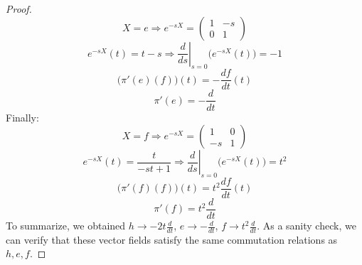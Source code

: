 \documentclass[12 pt]{article}
\begin{document}
\begin{proof}
\[    X = e \Rightarrow e^{-sX} =    \left( \begin{array} {cc} 1 & -s \\  0 & 1  \end{array} \right)   \]
\[      e^{-sX} (t) = t-s  \Rightarrow \left. \frac{d}{ds}\right|_{s=0} \big( e^{-sX} (t) \big) = -1  \]
\[     \big(  \pi'(e) (f) \big) (t) = - \frac{df}{dt} (t)    \]
\[      \pi'(e) = - \frac{d}{dt}    \]
Finally:
\[    X = f \Rightarrow e^{-sX} =    \left( \begin{array} {cc} 1 & 0 \\  -s & 1  \end{array} \right)   \]
\[      e^{-sX} (t) = \frac{t}{-st + 1} \Rightarrow \left. \frac{d}{ds}\right|_{s=0} \big( e^{-sX} (t) \big) = t^2  \]
\[     \big(  \pi'(f) (f) \big) (t) = t^2 \frac{df}{dt} (t)    \]
\[      \pi'(f) = t^2 \frac{d}{dt}    \]
To summarize, we obtained $h \to -2t \frac{d}{dt} $, $e \to  - \frac{d}{dt}$, $f \to  t^2 \frac{d}{dt}$. As a sanity check, we can verify that these vector fields satisfy the same commutation relations as $h,e,f$.
\end{proof}
\end{document}
